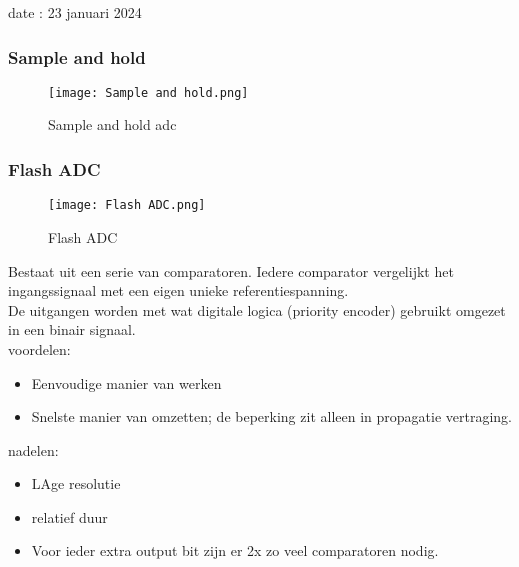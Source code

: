 date : 23 januari 2024

\subsubsection{Sample and hold}
\begin{figure}[H]
    \centering
    \texttt{[image: Sample and hold.png]}
    \caption*{Sample and hold adc}
    \end{figure}

\subsubsection{Flash ADC}
\begin{figure}[H]
    \centering
    \texttt{[image: Flash ADC.png]}
    \caption*{Flash ADC}
    \end{figure}

Bestaat uit een serie van comparatoren. Iedere comparator vergelijkt het ingangssignaal met een eigen unieke referentiespanning.\\
De uitgangen worden met wat digitale logica (priority encoder)
gebruikt omgezet in een binair signaal.\\
voordelen:
\begin{itemize}
    \item Eenvoudige manier van werken
    \item Snelste manier van omzetten; de beperking zit alleen in propagatie vertraging.
\end{itemize}
nadelen:
\begin{itemize}
    \item LAge resolutie
    \item relatief duur
    \item Voor ieder extra output bit zijn er 2x zo veel comparatoren nodig.
\end{itemize}

